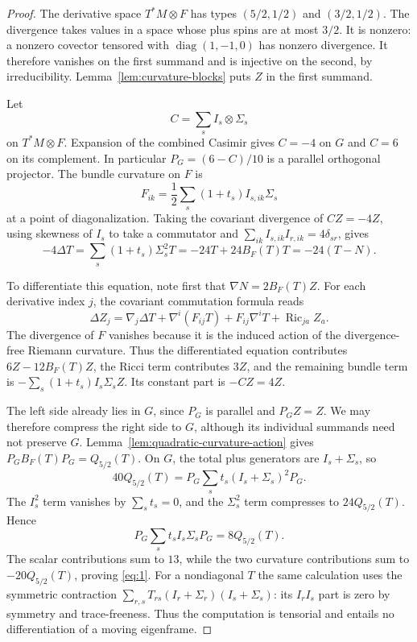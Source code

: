 \begin{proof}
The derivative space $T^*M\otimes F$ has types
$(5/2,1/2)$ and $(3/2,1/2)$. The divergence takes values in a space
whose plus spins are at most $3/2$. It is nonzero: a nonzero covector
tensored with $\operatorname{diag}(1,-1,0)$ has nonzero divergence.
It therefore vanishes on the first summand and is injective on the
second, by irreducibility. Lemma~\ref{lem:curvature-blocks} puts $Z$
in the first summand.

Let
\[
 C=\sum_s I_s\otimes\Sigma_s
\]
on $T^*M\otimes F$. Expansion of the combined Casimir gives
$C=-4$ on $G$ and $C=6$ on its complement. In particular
$P_G=(6-C)/10$ is a parallel orthogonal projector. The bundle
curvature on $F$ is
\[
 F_{ik}=\frac12\sum_s(1+t_s)I_{s,ik}\Sigma_s
\]
at a point of diagonalization. Taking the covariant divergence of
$CZ=-4Z$, using skewness of $I_s$ to take a commutator and
$\sum_{ik}I_{s,ik}I_{r,ik}=4\delta_{sr}$, gives
\[
 -4\Delta T=\sum_s(1+t_s)\Sigma_s^2T
            =-24T+24B_F(T)T=-24(T-N).
\]

To differentiate this equation, note first that
$\nabla N=2B_F(T)Z$. For each derivative index $j$, the covariant
commutation formula reads
\[
 \Delta Z_j
 =\nabla_j\Delta T+\nabla^i(F_{ij}T)
                    +F_{ij}\nabla^iT
                    +\operatorname{Ric}_{ja}Z_a.
\]
The divergence of $F$ vanishes because it is the induced action of
the divergence-free Riemann curvature. Thus the differentiated
equation contributes $6Z-12B_F(T)Z$, the Ricci term contributes
$3Z$, and the remaining bundle term is
$-\sum_s(1+t_s)I_s\Sigma_sZ$. Its constant part is $-CZ=4Z$.

The left side already lies in $G$, since $P_G$ is parallel and
$P_GZ=Z$. We may therefore compress the right side to $G$,
although its individual summands need not preserve $G$.
Lemma~\ref{lem:quadratic-curvature-action} gives
$P_GB_F(T)P_G=Q_{5/2}(T)$. On $G$, the total plus generators are
$I_s+\Sigma_s$, so
\[
 40Q_{5/2}(T)
 =P_G\sum_s t_s(I_s+\Sigma_s)^2P_G.
\]
The $I_s^2$ term vanishes by $\sum_s t_s=0$, and the $\Sigma_s^2$
term compresses to $24Q_{5/2}(T)$. Hence
\[
 P_G\sum_s t_s I_s\Sigma_sP_G=8Q_{5/2}(T).
\]
The scalar contributions sum to $13$, while the two curvature
contributions sum to $-20Q_{5/2}(T)$, proving \eqref{eq:1}.
For a nondiagonal $T$ the same calculation uses the symmetric
contraction $\sum_{r,s}T_{rs}(I_r+\Sigma_r)(I_s+\Sigma_s)$:
its $I_rI_s$ part is zero by symmetry and trace-freeness.
Thus the computation is tensorial and entails no differentiation
of a moving eigenframe.
\end{proof}

